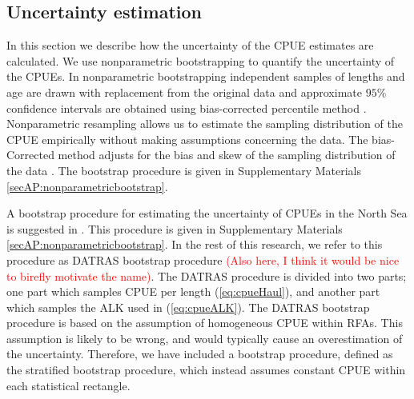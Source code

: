 \documentclass[a4paper 12pt]{article}
\numberwithin{equation}{section}
\newcommand{\ed}[1]{\textcolor{red}{#1}}
\begin{document}
{\subsection{Uncertainty estimation}
\label{sec:uncertaintyestimation}
In this section we describe how the uncertainty of the CPUE estimates are calculated. We use nonparametric bootstrapping to quantify the uncertainty of the CPUEs. In nonparametric bootstrapping independent samples of lengths and age are drawn with replacement from the original data and approximate $95\%$ confidence intervals are obtained using bias-corrected percentile method  \citep{carpenter2000bootstrap}. Nonparametric resampling allows us to estimate the sampling distribution of the CPUE empirically without making assumptions concerning the data. The bias-Corrected method adjusts for the bias and skew of the sampling distribution of the data \citep{puth2015variety, karlsson2009bootstrap}. The bootstrap procedure is given in Supplementary Materials \ref{secAP:nonparametricbootstrap}.  

A bootstrap procedure for estimating the uncertainty of CPUEs in the North Sea is suggested in \citet{ICES2013}. This procedure is given in Supplementary Materials \ref{secAP:nonparametricbootstrap}. In the rest of this research, we refer to this procedure as DATRAS bootstrap procedure \ed{(Also here, I think it would be nice to birefly motivate the name)}. The DATRAS procedure is divided into two parts; one part which samples CPUE per length (\ref{eq:cpueHaul}), and another part which samples the ALK used in (\ref{eq:cpueALK}). The DATRAS bootstrap procedure is based on the assumption of homogeneous CPUE within RFAs. This assumption is likely to be wrong, and would typically cause an overestimation of the uncertainty.  Therefore, we have included a bootstrap procedure, defined as the stratified bootstrap procedure, which instead assumes constant CPUE within each statistical rectangle. 

}
\end{document}
